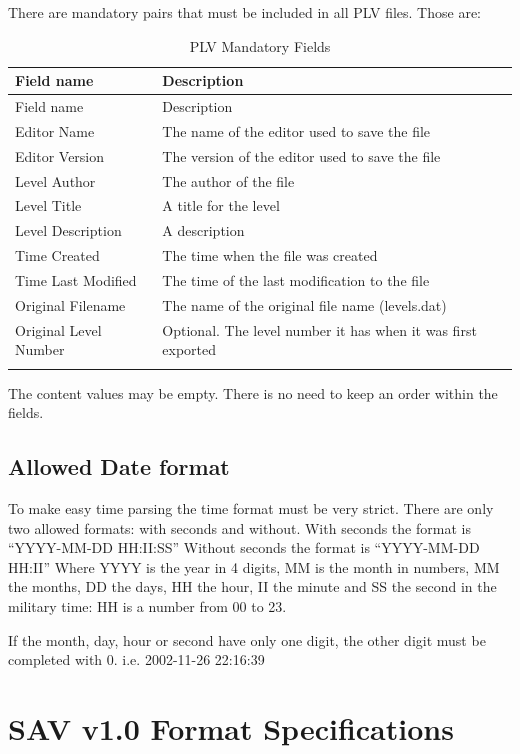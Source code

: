 \documentclass{article}
\begin{document}
 There are mandatory pairs that must be included in all PLV files.
 Those are:

\begin{longtable}{lp{7cm}}
\hline
 Field name             & Description \\
\hline
\endfirsthead
\hline
 Field name             & Description \\
\hline
\endhead
\hline
 Editor Name            & The name of the editor used to save the file \\
 Editor Version         & The version of the editor used to save the file \\
 Level Author           & The author of the file \\
 Level Title            & A title for the level \\
 Level Description      & A description \\
 Time Created           & The time when the file was created \\
 Time Last Modified     & The time of the last modification to the file \\
 Original Filename      & The name of the original file name (levels.dat) \\
 Original Level Number  & Optional. The level number it has when it was first exported \\
\hline
\caption{PLV Mandatory Fields}
\label{plv mandatory fields}
\end{longtable}
 
 The content values may be empty. There is no need to keep an order within
 the fields.

\subsection{Allowed Date format}
 To make easy time parsing the time format must be very strict.
 There are only two allowed formats: with seconds and without.
 With seconds the format is ``YYYY-MM-DD HH:II:SS''
 Without seconds the format is ``YYYY-MM-DD HH:II''
 Where YYYY is the year in 4 digits, MM is the month in numbers, MM the
 months, DD the days, HH the hour, II the minute and SS the second in the
 military time: HH is a number from 00 to 23.

 If the month, day, hour or second have only one digit, the other digit
 must be completed with 0.
 i.e. 2002-11-26 22:16:39

\pagebreak[3]
\section{SAV v1.0 Format Specifications}
\end{document}
